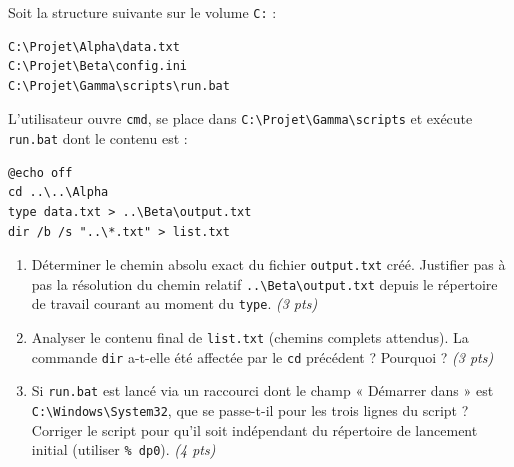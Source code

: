 \documentclass[11pt]{article}
\begin{document}
\begin{exercice}
Soit la structure suivante sur le volume \texttt{C:} :
\begin{verbatim}
C:\Projet\Alpha\data.txt
C:\Projet\Beta\config.ini
C:\Projet\Gamma\scripts\run.bat
\end{verbatim}
L'utilisateur ouvre \texttt{cmd}, se place dans \texttt{C:\textbackslash Projet\textbackslash Gamma\textbackslash scripts} et exécute \texttt{run.bat} dont le contenu est :
\begin{verbatim}
@echo off
cd ..\..\Alpha
type data.txt > ..\Beta\output.txt
dir /b /s "..\*.txt" > list.txt
\end{verbatim}
\begin{enumerate}
    \item Déterminer le chemin absolu exact du fichier \texttt{output.txt} créé. Justifier pas à pas la résolution du chemin relatif \texttt{..\textbackslash Beta\textbackslash output.txt} depuis le répertoire de travail courant au moment du \texttt{type}. \textit{(3 pts)}
    \item Analyser le contenu final de \texttt{list.txt} (chemins complets attendus). La commande \texttt{dir} a-t-elle été affectée par le \texttt{cd} précédent ? Pourquoi ? \textit{(3 pts)}
    \item Si \texttt{run.bat} est lancé via un raccourci dont le champ « Démarrer dans » est \texttt{C:\textbackslash Windows\textbackslash System32}, que se passe-t-il pour les trois lignes du script ? Corriger le script pour qu'il soit indépendant du répertoire de lancement initial (utiliser \texttt{\%~dp0}). \textit{(4 pts)}
\end{enumerate}
\end{exercice}
\end{document}
